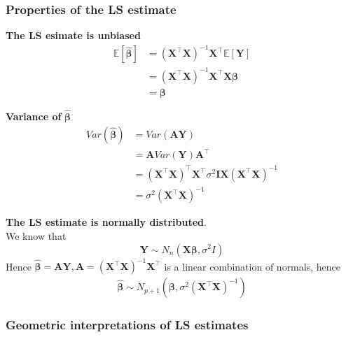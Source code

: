 \subsubsection{Properties of the LS estimate} 

\begin{result}
    \textbf{The LS esimate is unbiased}
    \begin{align*}
        \mathbb{E}\left[ \hat{ \bm{ \beta}}\right]  &= \left( \bm{X}^{\top} \bm{X} \right)^{-1} \bm{X}^{\top}\mathbb{E}\left[ \bm{Y}\right]  \\
        &= \left( \bm{X}^{\top} \bm{X} \right)^{-1} \bm{X}^{\top} \bm{X \beta}  \\ 
        &= \bm{\beta}
    \end{align*}
\end{result}

\begin{result}
    \textbf{Variance of}  $\hat{\bm{\beta}}$ 
    \begin{align*}
        Var( \hat{ \bm{\beta}}) &= Var \left( \bm{AY} \right)  \\
        &= \bm{A} Var( \bm{Y}) \bm{A}^{\top} \\
        &= \left(\bm{X}^{\top} \bm{X}\right)^{\top} \bm{X}^{\top} \sigma^2 \bm{IX} \left( \bm{X}^{\top} \bm{X} \right)^{-1} \\
        &= \sigma^2 \left( \bm{X}^{\top} \bm{X} \right)^{-1}
    \end{align*}
\end{result}

\begin{result}
    \textbf{The LS estimate is normally distributed}. \\

    We know that 
    \[
        \bm{Y} \sim N_n \left( \bm{X \beta}, \sigma^2 I \right) 
    \]
    Hence $ \hat{ \bm{ \beta}} = \bm{AY}, \bm{A} = (\bm{X}^{\top} \bm{X})^{-1} \bm{X}^{\top}$ is a linear combination of normals, hence 
    \begin{align*}
        \hat{ \bm{\beta}} \sim N_{p + 1} \left( \bm{\beta}, \sigma^2 \left( \bm{X}^{\top} \bm{X} \right)^{-1}  \right) 
    \end{align*}
\end{result}

\subsubsection{Geometric interpretations of LS estimates}

